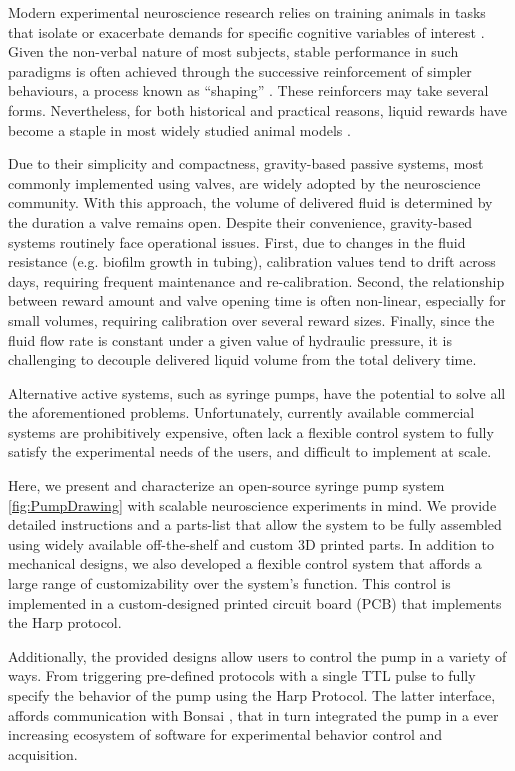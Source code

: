 Modern experimental neuroscience research relies on training animals in tasks that isolate or exacerbate demands for specific cognitive variables of interest \citep{Gomez-Marin2016}. Given the non-verbal nature of most subjects, stable performance in such paradigms is often achieved through the successive reinforcement of simpler behaviours, a process known as “shaping” \citep{Jones1939}. These reinforcers may take several forms. Nevertheless, for both historical and practical reasons, liquid rewards have become a staple in most widely studied animal models \citep{Guo2014}. 

Due to their simplicity and compactness, gravity-based passive systems, most commonly implemented using valves, are widely adopted by the neuroscience community. With this approach, the volume of delivered fluid is determined by the duration a valve remains open. Despite their convenience, gravity-based systems routinely face operational issues. First, due to changes in the fluid resistance (e.g. biofilm growth in tubing), calibration values tend to drift across days, requiring frequent maintenance and re-calibration. Second, the relationship between reward amount and valve opening time is often non-linear, especially for small volumes, requiring calibration over several reward sizes. Finally, since the fluid flow rate is constant under a given value of hydraulic pressure, it is challenging to decouple delivered liquid volume from the total delivery time.

Alternative active systems, such as syringe pumps, have the potential to solve all the aforementioned problems. Unfortunately, currently available commercial systems are prohibitively expensive, often lack a flexible control system to fully satisfy the experimental needs of the users, and difficult to implement at scale.

Here, we present and characterize an open-source syringe pump system \cref{fig:PumpDrawing} with scalable neuroscience experiments in mind. We provide detailed instructions and a parts-list that allow the system to be fully assembled using widely available off-the-shelf and custom 3D printed parts. 
In addition to mechanical designs, we also developed a flexible control system that affords a large range of customizability over the system's function. This control is implemented in a custom-designed printed circuit board (PCB) that implements the Harp protocol.

Additionally, the provided designs allow users to control the pump in a variety of ways. From triggering pre-defined protocols with a single TTL pulse to fully specify the behavior of the pump using the Harp Protocol. The latter interface, affords communication with Bonsai \citep{Lopes2015}, that in turn integrated the pump in a ever increasing ecosystem of software for experimental behavior control and acquisition.

